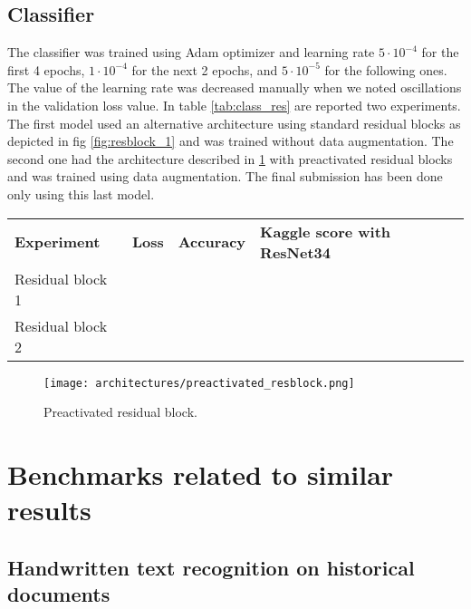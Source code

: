 \subsection{Classifier}
\label{ssec:classifierexp}

The classifier was trained using Adam optimizer and learning rate $5 \cdot 10^{-4}$ for the first 4 epochs, $1 \cdot 10^{-4}$ for the next 2 epochs, and $5 \cdot 10^{-5}$ for the following ones. The value of the learning rate was decreased manually when we noted oscillations in the validation loss value. In table \ref{tab:class_res} are reported two experiments. The first model used an alternative architecture using standard residual blocks as depicted in fig \ref{fig:resblock_1} and was trained without data augmentation. The second one had the architecture described in \ref{fig:preact_resblock} with preactivated residual blocks and was trained using data augmentation. The final submission has been done only using this last model.

\begin{table*}[h]
	\begin{tabular}{llll}
		\rowcolor[HTML]{EFEFEF} 
		\textbf{Experiment} & \textbf{Loss} & \textbf{Accuracy} & \textbf{Kaggle score with ResNet34} \\
		Residual block 1    &               &                   &                                     \\
		Residual block 2    &               &                   &                                    
	\end{tabular}
	\label{tab:class_res}
\end{table*}

\begin{figure}[h]
	\caption{Preactivated residual block.}
	\centering
	\texttt{[image: architectures/preactivated\_resblock.png]}
	\label{fig:preact_resblock}
\end{figure}

\section{Benchmarks related to similar results}
\label{sec:stateofart}

\subsection{Handwritten text recognition on historical documents}
\label{ssec:historicaldocuments}

